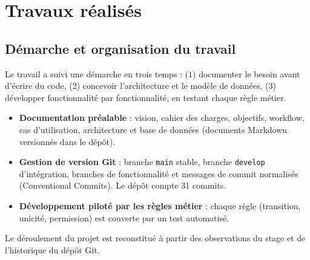 \chapter{Travaux réalisés}

\section{Démarche et organisation du travail}

Le travail a suivi une démarche en trois temps : (1) documenter le besoin avant d'écrire du code, (2) concevoir l'architecture et le modèle de données, (3) développer fonctionnalité par fonctionnalité, en testant chaque règle métier.

\begin{itemize}
  \item \textbf{Documentation préalable} : vision, cahier des charges, objectifs, workflow, cas d'utilisation, architecture et base de données (documents Markdown versionnés dans le dépôt).
  \item \textbf{Gestion de version Git} : branche \texttt{main} stable, branche \texttt{develop} d'intégration, branches de fonctionnalité et messages de commit normalisés (Conventional Commits). Le dépôt compte 31 commits.
  \item \textbf{Développement piloté par les règles métier} : chaque règle (transition, unicité, permission) est couverte par un test automatisé.
\end{itemize}

Le déroulement du projet est reconstitué à partir des observations du stage et de l'historique du dépôt Git.


